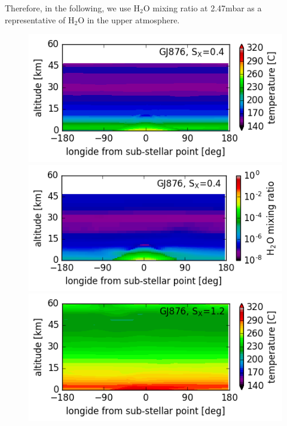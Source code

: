 \documentclass[11pt,numberedappendix,twocolappendix,]{emulateapj}
\def\water{H$_2$O }
\def\preslevel{2.47}
\begin{document}
Therefore, in the following, we use \water mixing ratio at \preslevel mbar as a representative of \water in the upper atmosphere. 

\begin{figure}[!hbt]
    \begin{minipage}{0.48\hsize}
    \begin{center}
\includegraphics[width=\hsize]{fig/ANN0109-0134aijlAqOH0TLS_GJ876S04P48L40Q_temp.png}
    \end{center}
     \end{minipage}
  \begin{minipage}{0.48\hsize}
    \begin{center}
    \includegraphics[width=\hsize]{fig/ANN0109-0134aijlAqOH0TLS_GJ876S04P48L40Q_xH2O.png}
    \end{center}
\end{minipage}
    \begin{minipage}{0.48\hsize}
    \begin{center}
\includegraphics[width=\hsize]{fig/ANN0231-0287aijlAqOH0TLS_GJ876S12P21L40Q_temp.png}

\end{center}
\end{minipage}
\end{figure}
\end{document}
